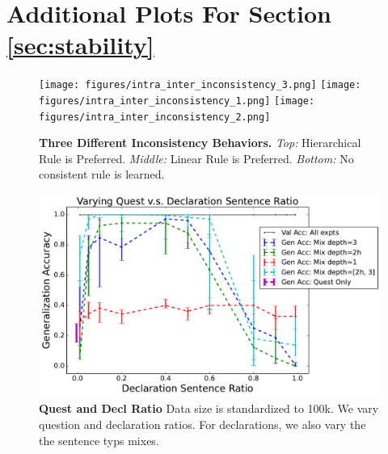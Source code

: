 \section{Additional Plots For Section \ref{sec:stability}}
\begin{figure}
    \centering
    \texttt{[image: figures/intra\_inter\_inconsistency\_3.png]}
    \linebreak
    \texttt{[image: figures/intra\_inter\_inconsistency\_1.png]}
    \linebreak
    \texttt{[image: figures/intra\_inter\_inconsistency\_2.png]}
   
    \caption{\textbf{Three Different Inconsistency Behaviors.} \textit{Top:} Hierarchical Rule is Preferred. \textit{Middle:} Linear Rule is Preferred. \textit{Bottom:} No consistent rule is learned. }
    \label{fig:intra_inter_inconsistency_original}
\end{figure}



\begin{figure}[h]
    \centering
    \includegraphics[width=1.0\textwidth]{figures/quest_decl_ratio.pdf}
    \caption{\textbf{Quest and Decl Ratio} Data size is standardized to 100k. We vary question and declaration ratios. For declarations, we also vary the the sentence typs mixes.  }
    \label{fig:quest_decl_ratio}
\end{figure}



\fi
